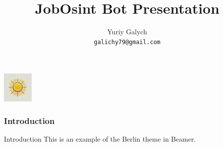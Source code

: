 \documentclass{beamer}
\title{JobOsint Bot Presentation}
\author{Yuriy Galych \\ \texttt{galichy79@gmail.com}} %
\date{} %
\begin{document}
\begin{frame}
    \centering
    \includegraphics[height=1.5cm]{logo.png} %
    \vspace{1cm}
    \titlepage
\end{frame}

\begin{frame}
    \frametitle{Introduction}
    \begin{block}{Introduction}
        This is an example of the Berlin theme in Beamer.
    \end{block}
\end{frame}
\end{document}
